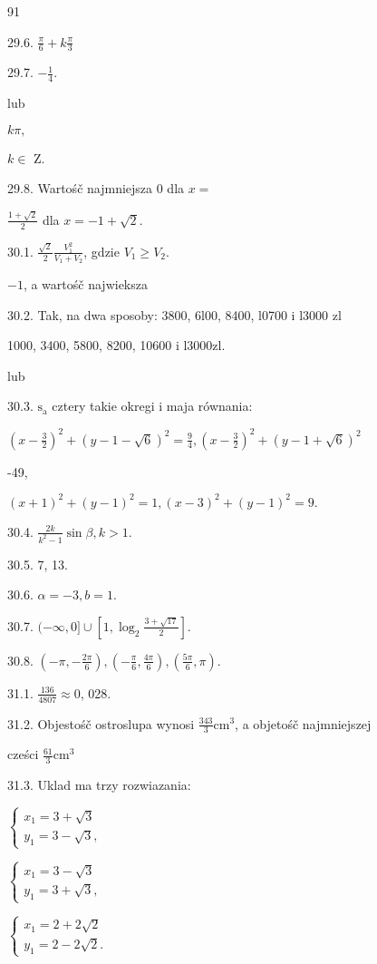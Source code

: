 \documentclass[a4paper,12pt]{article}
\begin{document}
91

29.6. $\displaystyle \frac{\pi}{6}+k\frac{\pi}{3}$

29.7. $-\displaystyle \frac{1}{4}.$

lub

$k\pi,$

$ k\in$ Z.

29.8. Wartośč najmniejsza 0 dla $x =$

$\displaystyle \frac{1+\sqrt{2}}{2}$ dla $x=-1+\sqrt{2}.$

30.1. $\displaystyle \frac{\sqrt{2}}{2}\frac{V_{1}^{2}}{V_{1}+V_{2}}$, gdzie $V_{1}\geq V_{2}.$

$-1$, a wartośč najwieksza

30.2. Tak, na dwa sposoby: 3800, 6l00, 8400, l0700 i l3000 zl

1000, 3400, 5800, 8200, 10600 i l3000zl.

lub

30.3. $\mathrm{s}_{\mathrm{a}}$ cztery takie okregi $\mathrm{i}$ maja równania:

$(x-\displaystyle \frac{3}{2})^{2} + (y-1-\sqrt{6})^{2} = \displaystyle \frac{9}{4}, (x-\displaystyle \frac{3}{2})^{2} + (y-1+\sqrt{6})^{2}$

-49,

$(x+1)^{2}+(y-1)^{2}=1, (x-3)^{2}+(y-1)^{2}=9.$

30.4. $\displaystyle \frac{2k}{k^{2}-1}\sin\beta, k>1.$

30.5. 7, 13.

30.6. $\alpha=-3, b=1.$

30.7. $(-\infty,0]\cup [1,\displaystyle \log_{2}\frac{3+\sqrt{17}}{2}].$

30.8. $(-\displaystyle \pi,-\frac{2\pi}{6}), (-\displaystyle \frac{\pi}{6},\frac{4\pi}{6}), (\displaystyle \frac{5\pi}{6},\pi).$

31.1. $\displaystyle \frac{136}{4807}\approx 0$, 028.

31.2. Objestośč ostroslupa wynosi $\displaystyle \frac{343}{3} \mathrm{c}\mathrm{m}^{3}$, a objetośč najmniejszej

cześci $\displaystyle \frac{61}{3}\mathrm{c}\mathrm{m}^{3}$

31.3. Uklad ma trzy rozwiazania:

$\left\{\begin{array}{l}
x_{1}=3+\sqrt{3}\\
y_{1}=3-\sqrt{3},
\end{array}\right.$

$\left\{\begin{array}{l}
x_{1}=3-\sqrt{3}\\
y_{1}=3+\sqrt{3},
\end{array}\right.$

$\left\{\begin{array}{l}
x_{1}=2+2\sqrt{2}\\
y_{1}=2-2\sqrt{2}.
\end{array}\right.$
\end{document}
